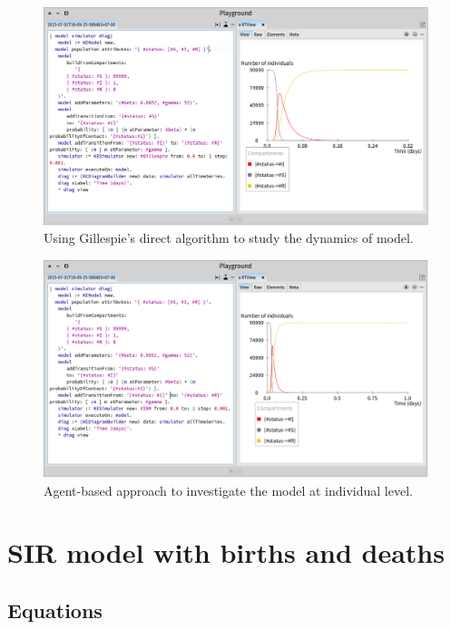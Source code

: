 \documentclass[a4paper,10pt,twoside]{book}
\begin{document}
\begin{figure}

\begin{center}
\includegraphics[width=1.0\textwidth]{figures/SIR_Gil.png}\caption{Using Gillespie's direct algorithm to study the dynamics of model.\label{SIR_Gil}}\end{center}
\end{figure}



\begin{figure}

\begin{center}
\includegraphics[width=1.0\textwidth]{figures/SIR_IBM.png}\caption{Agent-based approach to investigate the model at individual level.\label{SIR_IBM}}\end{center}
\end{figure}

\section{ SIR model with births and deaths}\subsection{ Equations}
\end{document}
